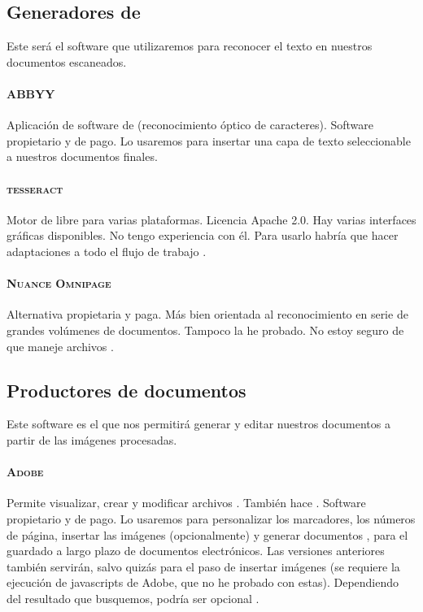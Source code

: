 \documentclass[%
	a5paper,
	10pt,
	twoside,
	openright,
	final,
]{memoir}
\begin{document}
{	\subsection{Generadores de \texorpdfstring{\ocr}{OCR}} Este será el software que utilizaremos para reconocer el texto en nuestros documentos escaneados.
	\paragraph{\textsc{ABBYY \abbyy}} Aplicación de software de \ocr (reconocimiento óptico de caracteres). Software propietario y de pago. Lo usaremos para insertar una capa de texto seleccionable a nuestros documentos finales.
	\paragraph{\textsc{tesseract}} Motor de \ocr libre para varias plataformas. Licencia Apache 2.0. Hay varias interfaces gráficas disponibles. No tengo experiencia con él. Para usarlo habría que hacer adaptaciones a todo el flujo de trabajo \cite{tesseract}.
	\paragraph{\textsc{Nuance Omnipage}} Alternativa propietaria y paga. Más bien orientada al reconocimiento en serie de grandes volúmenes de documentos. Tampoco la he probado. No estoy seguro de que maneje archivos \djvu \cite{Omnipage}.

	\subsection{Productores de documentos} Este software es el que nos permitirá generar y editar nuestros documentos a partir de las imágenes procesadas.
	\paragraph{\textsc{Adobe} \acrobat} Permite visualizar, crear y modificar archivos \pdf. También hace \ocr. Software propietario y de pago. Lo usaremos para personalizar los marcadores, los números de página, insertar las imágenes (opcionalmente) y generar documentos \pdfa, para el guardado a largo plazo de documentos electrónicos. Las versiones anteriores también servirán, salvo quizás para el paso de insertar imágenes (se requiere la ejecución de javascripts de Adobe, que no he probado con estas). Dependiendo del resultado que busquemos, podría ser opcional \cite{Acrobat}.
}
\end{document}
